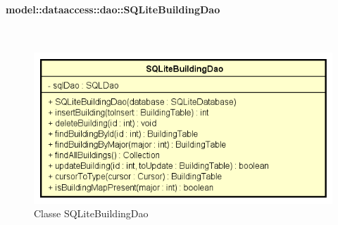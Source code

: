 \documentclass[../DefinizioneDiProdotto.tex]{subfiles}
\begin{document}
\paragraph{model::dataaccess::dao::SQLiteBuildingDao}
\
\begin{figure}[H]
	\centering
	\includegraphics[width=\maxwidth]{img/SQLiteBuildingDao.png}
	\caption{Classe SQLiteBuildingDao}\label{fig:model::dataaccess::dao::SQLiteBuildingDao} 
\end{figure}
\end{document}

